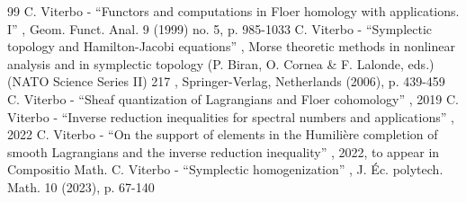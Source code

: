 \documentclass[10pt]{amsart}
\theoremstyle{definition}
\begin{document}
\begin{thebibliography}{99}
 C. Viterbo - “Functors and computations in Floer homology with applications. I” , Geom. Funct. Anal. 9 (1999) no. 5, p. 985-1033
 C. Viterbo - “Symplectic topology and Hamilton-Jacobi equations” , Morse theoretic methods in nonlinear analysis and in symplectic topology (P. Biran, O. Cornea \& F. Lalonde, eds.) (NATO Science Series II) 217 , Springer-Verlag, Netherlands (2006), p. 439-459
 C. Viterbo - “Sheaf quantization of Lagrangians and Floer cohomology” , 2019
 C. Viterbo - “Inverse reduction inequalities for spectral numbers and applications” , 2022
 C. Viterbo - “On the support of elements in the Humilière completion of smooth Lagrangians and the inverse reduction inequality” , 2022, to appear in Compositio Math.
 C. Viterbo - “Symplectic homogenization” , J. Éc. polytech. Math. 10 (2023), p. 67-140
\end{thebibliography}
\end{document}
